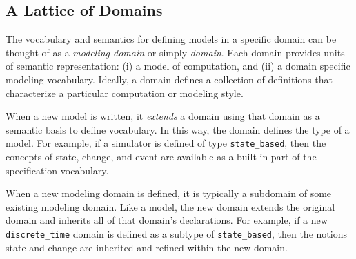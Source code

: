 \documentclass[12pt]{article}
\newcommand{\nael}[1]{\color{blue}{ \em #1 }\color{black}}
\renewcommand{\nael}[1]{}
\begin{document}
\nael{We need a domain to use as our case study here and to ground the descriptions.  The
  call mentions electronic warfare (EW), Intelligence surveillance and reconnaissance
  (ISR) and strike (which I assume is what it sounds like.)  Examples of EW and ISR from a
  quick search and skim include UaVs interacting with manned systems.  At one scale you
  have sensor data streaming with fine grained spatio-temporal resolution, and at another
  you are making tactical decisions at possibly much larger times and scales.}

\nael{From an AFOSR call on EW/ISR: ``The ultimate goal for airborne ISR and AEW/C2BM is
  to enable decision superiority and this will continue to be enabled by the confluence of
  hardware assets and the operators and analysts. Budgets will underpin the makeup of
  future capabilities and dictate the economics of introducing new platforms versus
  upgrading capabilities as existing platforms approach critical junctures in their
  operational lifecycle. In the case of radar systems, demand will come from existing
  platforms being retrofitted and upgraded, as well as opportunities from new manned and
  unmanned platforms, driving shipments a CAGR of 5 percent through 2022.''}

\subsection{A Lattice of Domains}

The vocabulary and semantics for defining models in a specific domain can be thought of as
a \emph{modeling domain} or simply \emph{domain}.  Each domain provides units of semantic
representation: (i) a model of computation, and (ii) a domain specific modeling
vocabulary.  Ideally, a domain defines a collection of definitions that characterize a
particular computation or modeling style.

When a new model is written, it \emph{extends} a domain using that domain as a semantic
basis to define vocabulary.  In this way, the domain defines the type of a model.  For
example, if a simulator is defined of type \lstinline!state_based!, then the concepts of
state, change, and event are available as a built-in part of the specification vocabulary.

When a new modeling domain is defined, it is typically a subdomain of some existing
modeling domain.  Like a model, the new domain extends the original domain and inherits
all of that domain's declarations.  For example, if a new \lstinline!discrete_time! domain
is defined as a subtype of \lstinline!state_based!, then the notions state and change are
inherited and refined within the new domain.
\end{document}
